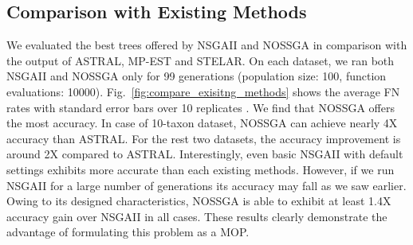 \subsection{Comparison with Existing Methods}
We evaluated the best trees offered by NSGAII and NOSSGA in comparison with the output of ASTRAL, MP-EST and STELAR. 
On each dataset, we ran both NSGAII and NOSSGA only for 99 generations (population size: 100, function evaluations: 10000). 
Fig.~\ref{fig:compare_exisitng_methods} shows the average FN rates with standard error bars over 10 replicates . We find that NOSSGA offers the most accuracy. In case of 10-taxon dataset, NOSSGA can achieve nearly 4X accuracy than ASTRAL. For the rest two datasets, the accuracy improvement is around 2X compared to ASTRAL. Interestingly, even basic NSGAII with default settings exhibits more accurate than each existing methods. However, if we run NSGAII for a large number of generations its accuracy may fall as we saw earlier. Owing to its designed characteristics, NOSSGA is able to exhibit at least 1.4X accuracy gain over NSGAII in all cases. These results clearly demonstrate the advantage of formulating this problem as a MOP. 




